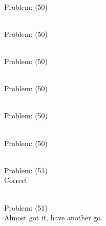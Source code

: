 \documentclass[11pt]{article}
\begin{document}
\begin{minipage}[t]{0.5\textwidth}
  {\centering
  
\\
Problem: (50)\\
  }
\end{minipage}
\begin{minipage}[t]{0.5\textwidth}
  {\centering
  
\\
Problem: (50)\\
  }
\end{minipage}
\begin{minipage}[t]{0.5\textwidth}
  {\centering
  
\\
Problem: (50)\\
  }
\end{minipage}
\begin{minipage}[t]{0.5\textwidth}
  {\centering
  
\\
Problem: (50)\\
  }
\end{minipage}
\begin{minipage}[t]{0.5\textwidth}
  {\centering
  
\\
Problem: (50)\\
  }
\end{minipage}
\begin{minipage}[t]{0.5\textwidth}
  {\centering
  
\\
Problem: (50)\\
  }
\end{minipage}
\begin{minipage}[t]{0.5\textwidth}
  {\centering
  
\\
Problem: (51)\\
Correct\\
  }
\end{minipage}
\begin{minipage}[t]{0.5\textwidth}
  {\centering
  
\\
Problem: (51)\\
Almost got it, have another go.\\
  }
\end{minipage}
\end{document}
